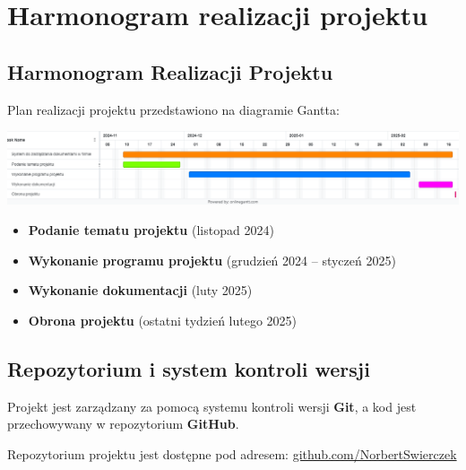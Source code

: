 ﻿%
\chapter{Harmonogram realizacji projektu}


\section{Harmonogram Realizacji Projektu}
Plan realizacji projektu przedstawiono na diagramie Gantta:

\begin{center}
    \includegraphics[width=1\textwidth]{gantt.png}
\end{center}

\begin{itemize}
    \item \textbf{Podanie tematu projektu} (listopad 2024)
    \item \textbf{Wykonanie programu projektu} (grudzień 2024 – styczeń 2025)
    \item \textbf{Wykonanie dokumentacji} (luty 2025)
    \item \textbf{Obrona projektu} (ostatni tydzień lutego 2025)
\end{itemize}

\section{Repozytorium i system kontroli wersji}

Projekt jest zarządzany za pomocą systemu kontroli wersji \textbf{Git}, a kod jest przechowywany w repozytorium \textbf{GitHub}. 

Repozytorium projektu jest dostępne pod adresem:
\href{https://github.com/NorbertSwierczek/P-L_Programowanie-obiektowe_3IIZ-2023-GPL02/tree/main/Projekt}{github.com/NorbertSwierczek}

